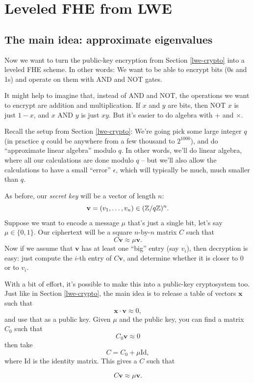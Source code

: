 \section{Leveled FHE from LWE}\label{fhe}

\subsection{The main idea: approximate eigenvalues}

Now we want to turn the public-key encryption from Section \ref{lwe-crypto} into
a leveled FHE scheme. In other words: We want to be able to encrypt bits
(0s and 1s) and operate on them with AND and NOT gates.

It might help to imagine that, instead of AND and NOT, the operations we
want to encrypt are addition and multiplication. If $x$ and $y$ are
bits, then NOT $x$ is just $1 - x$, and $x$ AND $y$ is just
$xy$. But it's easier to do algebra with $+$ and $\times$.

Recall the setup from Section \ref{lwe-crypto}: We're going pick some large
integer $q$ (in practice $q$ could be anywhere from a few thousand
to $2^{1000}$), and do ``approximate linear algebra'' modulo $q$. In
other words, we'll do linear algebra, where all our calculations are
done modulo $q$ -- but we'll also allow the calculations to have a
small ``error'' $\epsilon$, which will typically be much, much smaller
than $q$.

As before, our \emph{secret key} will be a vector of length $n$:
\[\mathbf{v} = ( v_{1},\ldots,v_{n} ) \in (\mathbb{Z}/q\mathbb{Z})^{n}.\]
Suppose we want to encode a message $\mu$ that's just a single bit,
let's say $\mu \in \{ 0,1 \}$. Our ciphertext will be a
square $n$-by-$n$ matrix $C$ such that
\[C\mathbf{v} \approx \mu\mathbf{v}.\] Now if we assume that
$\mathbf{v}$ has at least one ``big'' entry (say $v_{i}$), then
decryption is easy: just compute the $i$-th entry of $C\mathbf{v}$,
and determine whether it is closer to $0$ or to $v_{i}$.

\begin{remark}{}{}
With a bit of effort, it's possible to make this into a public-key
cryptosystem too. Just like in Section \ref{lwe-crypto}, the main idea is to
release a table of vectors $\mathbf{x}$ such that
\[\mathbf{x} \cdot \mathbf{v} \approx 0,\] and use that as a public key.
Given $\mu$ and the public key, you can find a matrix $C_{0}$ such
that \[C_{0}\mathbf{v} \approx 0\] then take
\[C = C_{0} + \mu\mathrm{Id},\] where $\mathrm{Id}$ is
the identity matrix. This gives a $C$ such that

\[C\mathbf{v} \approx \mu\mathbf{v}.\]
\end{remark}

